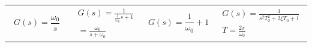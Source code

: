 \begin{tabularx}{\linewidth}{p{0.25\linewidth} p{0.25\linewidth} p{0.25\linewidth} p{0.25\linewidth} }
	\begin{equation*}
		G\left(s\right) = \frac{\omega_0}{s}
	\end{equation*}&
	\begin{align*}
		G\left(s\right)= \frac{1}{\frac{1}{\omega_0}s+1}  \\
						=\frac{\omega_0}{s+\omega_0}
	\end{align*}&
	\begin{equation*}
		G\left(s\right)=\frac{1}{\omega_0}+1
	\end{equation*}&
	\begin{align*}
	\nonumber
		G\left(s\right) =\frac{1}{s^2T_0^2+2\xi T_0+1} \\
		T = \frac{2\pi}{\omega_0}
	\end{align*} 
\end{tabularx}

